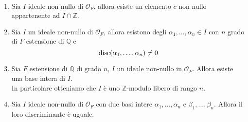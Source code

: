 \begin{proposizione} \
	\begin{enumerate}
		\item Sia $I$ ideale non-nullo di $\mathcal{O}_F$, allora esiste un elemento $c$ non-nullo appartenente ad $I\cap\mathbb{Z}$.
		\item Sia $I$ un ideale non-nullo di $\mathcal{O}_F$, allora esistono degli $\alpha_1,\dots,\alpha_n\in I$ con $n$ grado di $F$ estensione di $\mathbb{Q}$ e 
		\begin{equation*}
		\operatorname{disc}(\alpha_1,\dots,\alpha_n)\neq0
		\end{equation*}
		\item Sia $F$ estensione di $\mathbb{Q}$ di grado $n$, $I$ un ideale non-nullo in $\mathcal{O}_F$. Allora esiste una base intera di $I$. \\ In particolare otteniamo che $I$ è uno $\mathbb{Z}$-modulo libero di rango $n$.
		\item Sia $I$ ideale non-nullo di $\mathcal{O}_F$ con due basi intere $\alpha_1,\dots,\alpha_n$ e $\beta_1,\dots,\beta_n$. Allora il loro discriminante è uguale.
	\end{enumerate}
\end{proposizione}
